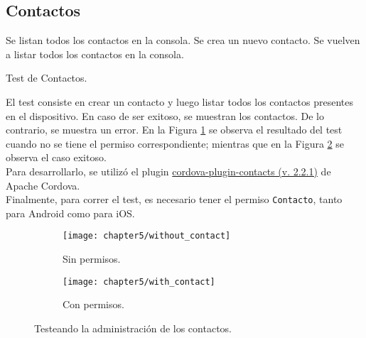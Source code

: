 \subsection{Contactos}
\begin{algorithm}
	\begin{algorithmic}[1]
		\STATE Se listan todos los contactos en la consola.
		\STATE Se crea un nuevo contacto.
		\STATE Se vuelven a listar todos los contactos en la consola.
	\end{algorithmic}
	\caption{Test de Contactos.}\label{alg:chap5:test_contactos}
\end{algorithm}
El test consiste en crear un contacto y luego listar todos los contactos presentes en el dispositivo. En caso de ser exitoso, se muestran los contactos. De lo contrario, se muestra un error. En la Figura \ref{fig:ch05:without_contact} se observa el resultado del test cuando no se tiene el permiso correspondiente; mientras que en la Figura \ref{fig:ch05:with_contact} se observa el caso exitoso.\\
Para desarrollarlo, se utilizó el plugin \href{https://www.npmjs.com/package/cordova-plugin-contacts}{cordova-plugin-contacts (v. 2.2.1)} de Apache Cordova.\\
Finalmente, para correr el test, es necesario tener el permiso \texttt{Contacto}, tanto para Android como para iOS.
\begin{figure}[htbp]
    \centering
    \begin{subfigure}{0.3\linewidth}
        \texttt{[image: chapter5/without\_contact]}
        \caption{Sin permisos.}
        \label{fig:ch05:without_contact}
    \end{subfigure}
    \begin{subfigure}{0.3\linewidth}
        \texttt{[image: chapter5/with\_contact]}
        \caption{Con permisos.}
        \label{fig:ch05:with_contact}
    \end{subfigure}
    \caption{Testeando la administración de los contactos.}
	\label{fig:ch05:contacts-cases}
\end{figure}

